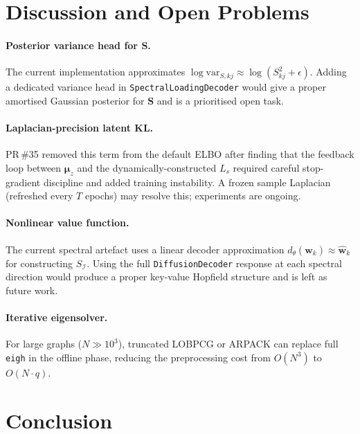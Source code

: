 \documentclass[11pt,a4paper]{article}
\newcommand{\I}{\mathcal{I}}
\newcommand{\bS}{\bm{S}}
\newcommand{\bmu}{\bm{\mu}}
\begin{document}
\section{Discussion and Open Problems}
\label{sec:discussion}

\paragraph{Posterior variance head for $\bS$.}
The current implementation approximates $\log\mathrm{var}_{S,kj}\approx\log(S_{kj}^2+\epsilon)$.
Adding a dedicated variance head in \texttt{SpectralLoadingDecoder} would give
a proper amortised Gaussian posterior for $\bS$ and is a prioritised open
task.

\paragraph{Laplacian-precision latent KL.}
PR\,\#35 removed this term from the default ELBO after finding that the
feedback loop between $\bmu_z$ and the dynamically-constructed $L_s$
required careful stop-gradient discipline and added training instability.
A frozen sample Laplacian (refreshed every $T$ epochs) may resolve this;
experiments are ongoing.

\paragraph{Nonlinear value function.}
The current spectral artefact uses a linear decoder approximation
$d_\theta(\hat{\bm{w}}_k)\approx\hat{\bm{w}}_k$ for constructing $S_{\I}$.
Using the full \texttt{DiffusionDecoder} response at each spectral direction
would produce a proper key-value Hopfield structure and is left as future work.

\paragraph{Iterative eigensolver.}
For large graphs ($N\gg 10^3$), truncated LOBPCG or ARPACK can replace
full \texttt{eigh} in the offline phase, reducing the preprocessing cost
from $O(N^3)$ to $O(N\cdot q)$.

\section{Conclusion}
\label{sec:conclusion}
\end{document}
